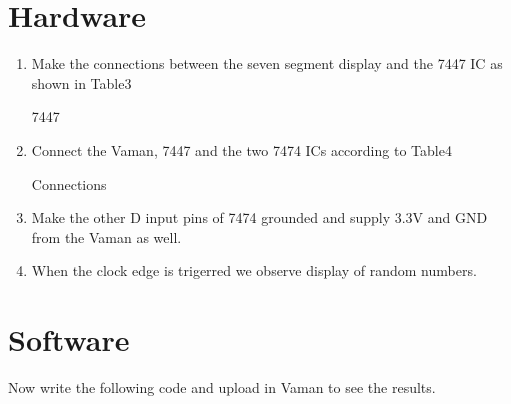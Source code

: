 \documentclass[10pt,a4paper]{article}
\begin{document}
\section{Hardware}
\begin{enumerate}
\item Make the connections between the seven segment display and the 7447 IC as shown in Table3
\begin{table}[!h]                                
\centering
   
\caption{7447}                               
\label{table:7447}                       
\end{table}
\item Connect the Vaman, 7447 and the two 7474 ICs according to Table4
\begin{table}[!h]                                 
\centering	
 
\caption{Connections}                                   
\label{table:connections}                       
\end{table}
\item Make the other D input pins of 7474 grounded and supply 3.3V and GND from the Vaman as well.
\item When the clock edge is trigerred we observe display of random numbers.
\end{enumerate}
\section{Software}
Now write the following code and upload in Vaman to see the results.

\end{document}

